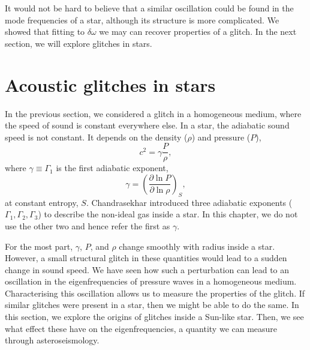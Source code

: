 It would not be hard to believe that a similar oscillation could be found in the mode frequencies of a star, although its structure is more complicated. We showed that fitting to \(\delta\omega\) we may can recover properties of a glitch. In the next section, we will explore glitches in stars.



\section{Acoustic glitches in stars}

In the previous section, we considered a glitch in a homogeneous medium, where the speed of sound is constant everywhere else. In a star, the adiabatic sound speed is not constant. It depends on the density (\(\rho\)) and pressure (\(P\)),
%
\begin{equation}
    c^2 = \gamma \frac{P}{\rho},
\end{equation}
%
where \(\gamma \equiv \Gamma_1\) is the first adiabatic exponent,
%
\begin{equation}
    \gamma = \left( \frac{\partial \ln P}{\partial \ln \rho} \right)_S,
\end{equation}
%
at constant entropy, \(S\). Chandrasekhar \needcite{} introduced three adiabatic exponents (\(\Gamma_1,\Gamma_2,\Gamma_3\)) to describe the non-ideal gas inside a star. In this chapter, we do not use the other two and hence refer the first as \(\gamma\).

For the most part, \(\gamma\), \(P\), and \(\rho\) change smoothly with radius inside a star. However, a small structural glitch in these quantities would lead to a sudden change in sound speed. We have seen how such a perturbation can lead to an oscillation in the eigenfrequencies of pressure waves in a homogeneous medium. Characterising this oscillation allows us to measure the properties of the glitch. If similar glitches were present in a star, then we might be able to do the same. In this section, we explore the origins of glitches inside a Sun-like star. Then, we see what effect these have on the eigenfrequencies, a quantity we can measure through asteroseismology.

